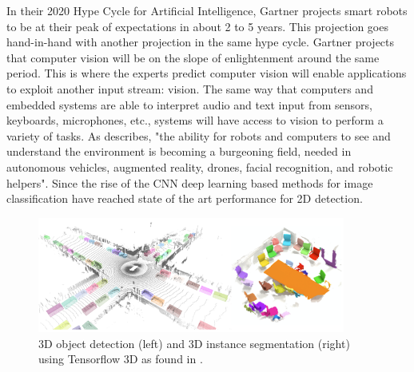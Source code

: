 In their 2020 Hype Cycle for Artificial Intelligence, Gartner projects smart robots to be at their peak of expectations in about 2 to 5 years. This projection goes hand-in-hand with another projection in the same hype cycle. Gartner projects that computer vision will be on the slope of enlightenment around the same period. This is where the experts predict computer vision will enable applications to exploit another input stream: vision. The same way that computers and embedded systems are able to interpret audio and text input from sensors, keyboards, microphones, etc., systems will have access to vision to perform a variety of tasks. 
As \textcite{singh2018fotonnet} describes, "the ability for robots and computers to see and understand the environment is becoming a burgeoning field, needed in autonomous vehicles, augmented reality, drones, facial recognition, and robotic helpers". Since the rise of the CNN \cite{krizhevsky2017imagenet} deep learning based methods for image classification have reached state of the art performance for 2D detection.



\begin{figure}[!ht]
        \centering
        \includegraphics[width=0.9\textwidth]{images/sceneU01.png}
        \caption{3D object detection (left) and 3D instance segmentation (right) using Tensorflow 3D as found in \cite{najibi2020dops}.
        }
        \label{fig:sceneU01}
\end{figure}


